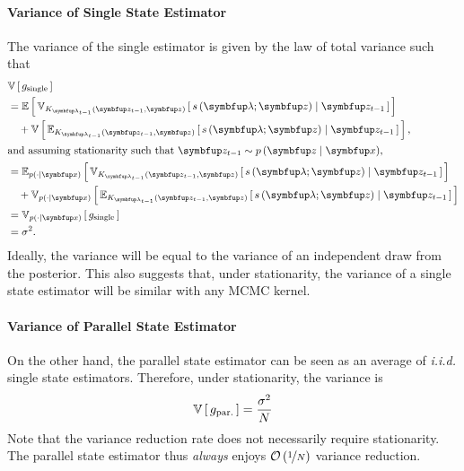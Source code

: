 \paragraph{Variance of Single State Estimator}
The variance of the single estimator is given by the law of total variance such that
\begin{align}
  &\V{g_{\text{single}}} \nonumber \\
  &= \E{ \Vsub{K_{\vlambda_{t-1}}\left(\vz_{t-1}, \vz\right)}{ s\left(\vlambda; \vz\right) \mid \vz_{t-1} }} \nonumber \\
  &\quad + \V{ \Esub{K_{\vlambda_{t-1}}\left(\vz_{t-1}, \vz\right)}{ s\left(\vlambda; \vz\right) \mid \vz_{t-1} } }, \\
  \intertext{and assuming stationarity such that \(\vz_{t-1} \sim p\left(\vz \mid \vx\right)\),}
  &= \Esub{p\left(\cdot \mid\vx \right)}{ \Vsub{K_{\vlambda_{t-1}}\left(\vz_{t-1}, \vz\right)}{ s\left(\vlambda; \vz\right) \mid \vz_{t-1} }} \nonumber\\
  &\quad + \Vsub{p\left(\cdot \mid\vx \right)}{ \Esub{K_{\vlambda_{t-1}}\left(\vz_{t-1}, \vz\right)}{ s\left(\vlambda; \vz\right) \mid \vz_{t-1} } } \\
  &= \Vsub{p\left(\cdot\mid\vx \right)}{g_{\text{single}}} \\
  &= \sigma^2.
\end{align}
Ideally, the variance will be equal to the variance of an independent draw from the posterior.
This also suggests that, under stationarity, the variance of a single state estimator will be similar with any MCMC kernel.

\vspace{-0.05in}
\paragraph{Variance of Parallel State Estimator}
On the other hand, the parallel state estimator can be seen as an average of \textit{i.i.d.} single state estimators.
Therefore, under stationarity, the variance is
\begin{align}
  \mathbb{V}\left[\,g_{\text{par.}}\,\right] = \frac{\sigma^2}{N}
\end{align}
Note that the variance reduction rate does not necessarily require stationarity.
The parallel state estimator thus \textit{always} enjoys \(\mathcal{O}\left(\nicefrac{1}{N}\right)\) variance reduction.

\vspace{-0.05in}
